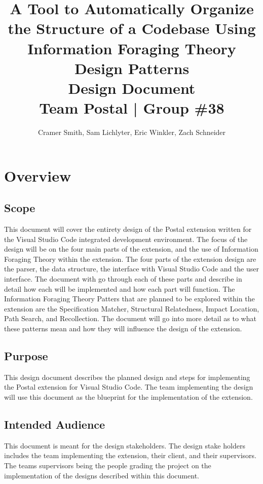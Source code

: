 \documentclass[letterpaper,10pt,titlepage,draftclsnofoot,onecolumn,onesided] {IEEEtran}
\def\doctitle{A Tool to Automatically Organize the Structure of a Codebase Using Information Foraging Theory Design Patterns}
\def\doctype{Design Document}
\def\team{Team Postal | Group \#38}
\begin{document}
\title{\Huge{\bfseries{\textsf{\doctitle}}}\\\textsf{\Large{\doctype}}\\\textsf{\large{\team}}}
\author{Cramer Smith, Sam Lichlyter, Eric Winkler, Zach Schneider}

\maketitle
\vfill
\vfill

\pagebreak

\tableofcontents

\pagebreak

\section{Overview}

\subsection{Scope}
This document will cover the entirety design of the Postal extension written for the Visual Studio Code integrated development environment. 
The focus of the design will be on the four main parts of the extension, and the use of Information Foraging Theory within the extension.
The four parts of the extension design are the parser, the data structure, the interface with Visual Studio Code and the user interface.
The document with go through each of these parts and describe in detail how each will be implemented and how each part will function.
The Information Foraging Theory Patters that are planned to be explored within the extension are the Specification Matcher, Structural Relatedness, Impact Location, Path Search, and Recollection.
The document will go into more detail as to what these patterns mean and how they will influence the design of the extension.

\subsection{Purpose}
This design document describes the planned design and steps for implementing the Postal extension for Visual Studio Code. 
The team implementing the design will use this document as the blueprint for the implementation of the extension. 

\subsection{Intended Audience}
This document is meant for the design stakeholders. 
The design stake holders includes the team implementing the extension, their client, and their supervisors. 
The teams supervisors being the people grading the project on the implementation of the designs described within this document.
\end{document}
